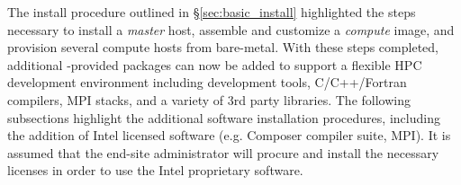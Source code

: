 The install procedure outlined in \S\ref{sec:basic_install} highlighted the
steps necessary to install a {\em master} host, assemble and customize a {\em
  compute} image, and provision several compute hosts from bare-metal. With
these steps completed, additional \OHPC{}-provided packages can now be added to
support a flexible HPC development environment including development tools,
C/C++/Fortran compilers, MPI stacks, and a variety of 3rd party libraries. The
following subsections highlight the additional software installation
procedures, including the addition of Intel licensed software (e.g. Composer
compiler suite, \Intel{} MPI). It is assumed that the end-site administrator
will procure and install the necessary licenses in order to use the Intel
proprietary software.
